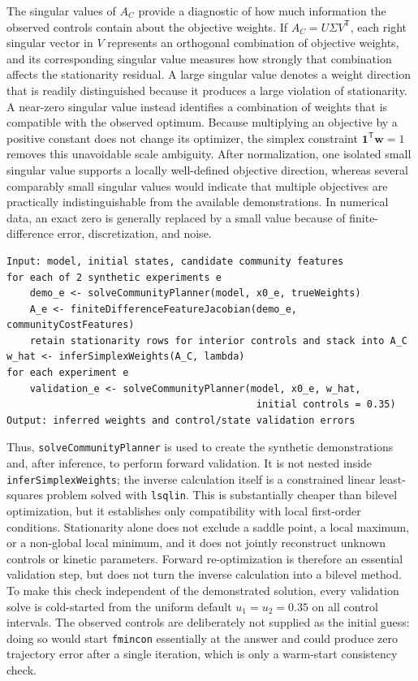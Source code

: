 \documentclass[11pt,a4paper]{article}
\newcommand{\vect}[1]{\boldsymbol{#1}}
\begin{document}
The singular values of \(A_C\) provide a diagnostic of how much information
the observed controls contain about the objective weights. If
\(A_C=U\Sigma V^{\mathsf T}\), each right singular vector in \(V\) represents
an orthogonal combination of objective weights, and its corresponding singular
value measures how strongly that combination affects the stationarity
residual. A large singular value denotes a weight direction that is readily
distinguished because it produces a large violation of stationarity. A
near-zero singular value instead identifies a combination of weights that is
compatible with the observed optimum. Because multiplying an objective by a
positive constant does not change its optimizer, the simplex constraint
\(\vect{1}^{\mathsf T}\vect{w}=1\) removes this unavoidable scale ambiguity.
After normalization, one isolated small singular value supports a locally
well-defined objective direction, whereas several comparably small singular
values would indicate that multiple objectives are practically
indistinguishable from the available demonstrations. In numerical data, an
exact zero is generally replaced by a small value because of finite-difference
error, discretization, and noise.

\noindent\begin{minipage}{\linewidth}
\begin{lstlisting}[style=pseudostyle,title={Compact MATLAB pseudocode}]
Input: model, initial states, candidate community features
for each of 2 synthetic experiments e
    demo_e <- solveCommunityPlanner(model, x0_e, trueWeights)
    A_e <- finiteDifferenceFeatureJacobian(demo_e, communityCostFeatures)
    retain stationarity rows for interior controls and stack into A_C
w_hat <- inferSimplexWeights(A_C, lambda)
for each experiment e
    validation_e <- solveCommunityPlanner(model, x0_e, w_hat,
                                           initial controls = 0.35)
Output: inferred weights and control/state validation errors
\end{lstlisting}
\end{minipage}

Thus, \texttt{solveCommunityPlanner} is used to create the synthetic
demonstrations and, after inference, to perform forward validation. It is not
nested inside \texttt{inferSimplexWeights}; the inverse calculation itself is
a constrained linear least-squares problem solved with \texttt{lsqlin}. This
is substantially cheaper than bilevel optimization, but it establishes only
compatibility with local first-order conditions. Stationarity alone does not
exclude a saddle point, a local maximum, or a non-global local minimum, and it
does not jointly reconstruct unknown controls or kinetic parameters. Forward
re-optimization is therefore an essential validation step, but does not turn
the inverse calculation into a bilevel method. To make this check independent
of the demonstrated solution, every validation solve is cold-started from the
uniform default \(u_1=u_2=0.35\) on all control intervals. The observed
controls are deliberately not supplied as the initial guess: doing so would
start \texttt{fmincon} essentially at the answer and could produce zero
trajectory error after a single iteration, which is only a warm-start
consistency check.
\end{document}

